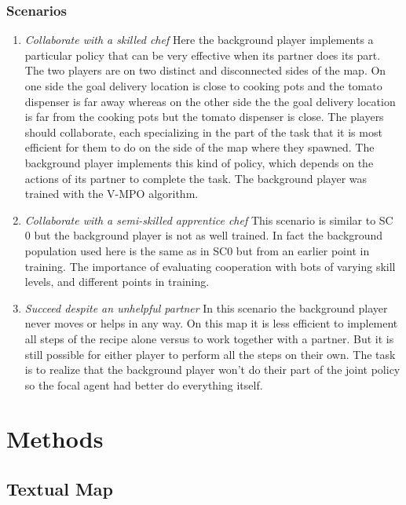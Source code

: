 \documentclass{article} %
\begin{document}
\subsubsection{Scenarios}
\begin{enumerate}
    \item[\textbf{SC0:}] \textit{Collaborate with a skilled chef}  Here the
background player implements a particular policy that can be very effective when
its partner does its part. The two players
are on two distinct and disconnected sides
of the map. On one side the goal delivery
location is close to cooking pots and the
tomato dispenser is far away whereas on
the other side the the goal delivery location
is far from the cooking pots but the tomato
dispenser is close. The players should collaborate, each specializing in the part of
the task that it is most efficient for them
to do on the side of the map where they
spawned. The background player implements this kind of policy, which depends on
the actions of its partner to complete the
task. The background player was trained
with the V-MPO algorithm.
    \item[\textbf{SC1:}] \textit{Collaborate with a semi-skilled apprentice
chef}  This scenario is similar to SC 0 but the
background player is not as well trained. In
fact the background population used here is
the same as in SC0 but from an earlier point
in training. The importance of evaluating
cooperation with bots of varying skill levels,
and different points in training.
    \item[\textbf{SC2:}] \textit{Succeed despite an unhelpful partner}  In
this scenario the background player never
moves or helps in any way. On this map it
is less efficient to implement all steps of the
recipe alone versus to work together with
a partner. But it is still possible for either
player to perform all the steps on their own.
The task is to realize that the background
player won’t do their part of the joint policy
so the focal agent had better do everything
itself.
\end{enumerate}


\section{Methods}

\subsection{Textual Map}
\end{document}
